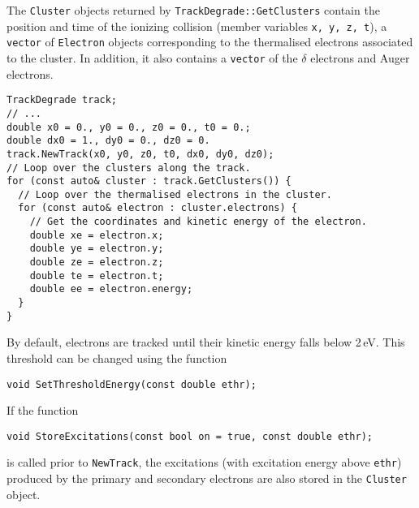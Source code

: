 The \texttt{Cluster} objects returned by \texttt{TrackDegrade::GetClusters} 
contain the position and time of the ionizing collision 
(member variables \texttt{x, y, z, t}), a \texttt{vector} of 
\texttt{Electron} objects corresponding to the thermalised electrons 
associated to the cluster. In addition, it also contains a \texttt{vector} 
of the $\delta$ electrons and Auger electrons.

\begin{lstlisting}
TrackDegrade track;
// ...
double x0 = 0., y0 = 0., z0 = 0., t0 = 0.;
double dx0 = 1., dy0 = 0., dz0 = 0.
track.NewTrack(x0, y0, z0, t0, dx0, dy0, dz0);
// Loop over the clusters along the track.
for (const auto& cluster : track.GetClusters()) {
  // Loop over the thermalised electrons in the cluster.
  for (const auto& electron : cluster.electrons) {
    // Get the coordinates and kinetic energy of the electron.
    double xe = electron.x;
    double ye = electron.y;
    double ze = electron.z;
    double te = electron.t;
    double ee = electron.energy;
  }
}
\end{lstlisting}

By default, electrons are tracked until their kinetic energy falls below 
2\,eV. This threshold can be changed using the function
\begin{lstlisting}
void SetThresholdEnergy(const double ethr);
\end{lstlisting}

If the function 
\begin{lstlisting}
void StoreExcitations(const bool on = true, const double ethr);
\end{lstlisting}
is called prior to \texttt{NewTrack}, the excitations (with excitation 
energy above \texttt{ethr}) produced by the primary and secondary electrons 
are also stored in the \texttt{Cluster} object. 
